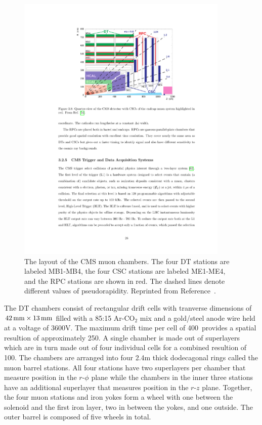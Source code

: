 \begin{figure}[htbp]
  \centering
  \includegraphics[width=0.9\textwidth]{Detector/Figures/cms_muons.pdf}
  \caption{
    The layout of the CMS muon chambers.
    The four DT stations are labeled MB1-MB4, the four CSC stations are labeled ME1-ME4, and the RPC stations are shown in red.
    The dashed lines denote different values of pseudorapidity.
    Reprinted from Reference~\cite{}. %
  }
  \label{fig:cms_muons}
\end{figure}

The DT chambers consist of rectangular drift cells with tranverse dimensions of $42\,\text{mm} \times 13\,\text{mm}$ filled with a 85:15 Ar-CO$_2$ mix and a gold/steel anode wire held at a voltage of 3600\unit{V}.
The  maximum drift time per cell of 400\ns\ provides a spatial resultion of approximately 250\mum.
A single chamber is made out of superlayers which are in turn made out of four individual cells for a combined resultion of 100\mum.
The chambers are arranged into four 2.4\unit{m} thick dodecagonal rings called the muon barrel stations.
All four stations have two superlayers per chamber that measure position in the $r$-$\phi$ plane while the chambers in the inner three stations have an additional superlayer that measures position in the $r$-$z$ plane.
Together, the four muon stations and iron yokes form a wheel with one between the solenoid and the first iron layer, two in between the yokes, and one outside.
The outer barrel is composed of five wheels in total. 


